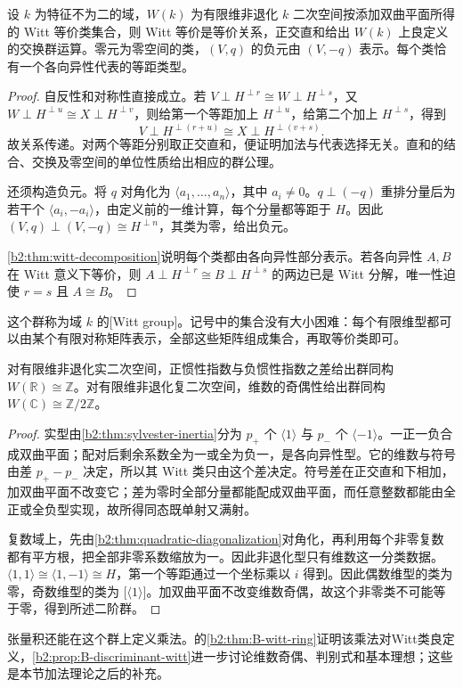 \begin{theorem}\label{b2:thm:witt-group}
	设 \(k\) 为特征不为二的域，\(W(k)\) 为有限维非退化 \(k\) 二次空间按添加双曲平面所得的 Witt 等价类集合，则 Witt 等价是等价关系，正交直和给出 \(W(k)\) 上良定义的交换群运算。零元为零空间的类，\((V,q)\) 的负元由 \((V,-q)\) 表示。每个类恰有一个各向异性代表的等距类型。
\end{theorem}
\begin{proof}
	自反性和对称性直接成立。若 \(V\perp H^{\perp r}\cong W\perp H^{\perp s}\)，又 \(W\perp H^{\perp u}\cong X\perp H^{\perp v}\)，则给第一个等距加上 \(H^{\perp u}\)，给第二个加上 \(H^{\perp s}\)，得到
	\[
		V\perp H^{\perp(r+u)}\cong X\perp H^{\perp(v+s)}.
	\]
	故关系传递。对两个等距分别取正交直和，便证明加法与代表选择无关。直和的结合、交换及零空间的单位性质给出相应的群公理。

	还须构造负元。将 \(q\) 对角化为 \(\langle a_1,\ldots,a_n\rangle\)，其中 \(a_i\ne0\)。\(q\perp(-q)\) 重排分量后为若干个 \(\langle a_i,-a_i\rangle\)，由定义前的一维计算，每个分量都等距于 \(H\)。因此 \((V,q)\perp(V,-q)\cong H^{\perp n}\)，其类为零，给出负元。

	\cref{b2:thm:witt-decomposition}说明每个类都由各向异性部分表示。若各向异性 \(A,B\) 在 Witt 意义下等价，则 \(A\perp H^{\perp r}\cong B\perp H^{\perp s}\) 的两边已是 Witt 分解，唯一性迫使 \(r=s\) 且 \(A\cong B\)。
\end{proof}

这个群称为域 \(k\) 的[Witt group]。记号中的集合没有大小困难：每个有限维型都可以由某个有限对称矩阵表示，全部这些矩阵组成集合，再取等价类即可。

\begin{proposition}\label{b2:prop:witt-real-complex}
	对有限维非退化实二次空间，正惯性指数与负惯性指数之差给出群同构 \(W(\mathbb R)\cong\mathbb Z\)。对有限维非退化复二次空间，维数的奇偶性给出群同构 \(W(\mathbb C)\cong\mathbb Z/2\mathbb Z\)。
\end{proposition}
\begin{proof}
	实型由\cref{b2:thm:sylvester-inertia}分为 \(p_+\) 个 \(\langle1\rangle\) 与 \(p_-\) 个 \(\langle-1\rangle\)。一正一负合成双曲平面；配对后剩余系数全为一或全为负一，是各向异性型。它的维数与符号由差 \(p_+-p_-\) 决定，所以其 Witt 类只由这个差决定。符号差在正交直和下相加，加双曲平面不改变它；差为零时全部分量都能配成双曲平面，而任意整数都能由全正或全负型实现，故所得同态既单射又满射。

	复数域上，先由\cref{b2:thm:quadratic-diagonalization}对角化，再利用每个非零复数都有平方根，把全部非零系数缩放为一。因此非退化型只有维数这一分类数据。\(\langle1,1\rangle\cong\langle1,-1\rangle\cong H\)，第一个等距通过一个坐标乘以 \(i\) 得到。因此偶数维型的类为零，奇数维型的类为 \(\bigl[\langle1\rangle\bigr]\)。加双曲平面不改变维数奇偶，故这个非零类不可能等于零，得到所述二阶群。
\end{proof}

张量积还能在这个群上定义乘法。的\cref{b2:thm:B-witt-ring}证明该乘法对Witt类良定义，\cref{b2:prop:B-discriminant-witt}进一步讨论维数奇偶、判别式和基本理想；这些是本节加法理论之后的补充。
